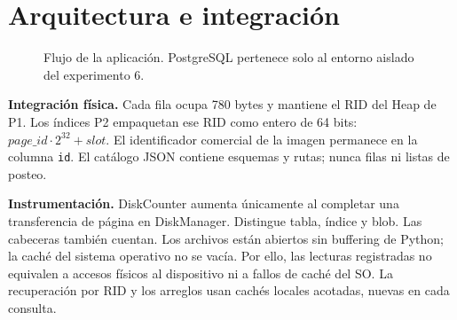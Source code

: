 \documentclass[11pt,a4paper]{article}
\newcommand{\code}[1]{\texttt{#1}}
\begin{document}
\section{Arquitectura e integración}\label{sec:arq}
\begin{figure}[H]\centering
{}
\caption{Flujo de la aplicación. PostgreSQL pertenece solo al entorno aislado del experimento 6.}
\end{figure}

\textbf{Integración física.} Cada fila ocupa 780 bytes y mantiene el RID del Heap de P1. Los índices P2 empaquetan ese RID como entero de 64 bits: $page\_id\cdot 2^{32}+slot$. El identificador comercial de la imagen permanece en la columna \code{id}. El catálogo JSON contiene esquemas y rutas; nunca filas ni listas de posteo.

\textbf{Instrumentación.} DiskCounter aumenta únicamente al completar una transferencia de página en DiskManager. Distingue tabla, índice y blob. Las cabeceras también cuentan. Los archivos están abiertos sin buffering de Python; la caché del sistema operativo no se vacía. Por ello, las lecturas registradas no equivalen a accesos físicos al dispositivo ni a fallos de caché del SO. La recuperación por RID y los arreglos usan cachés locales acotadas, nuevas en cada consulta.
\end{document}
